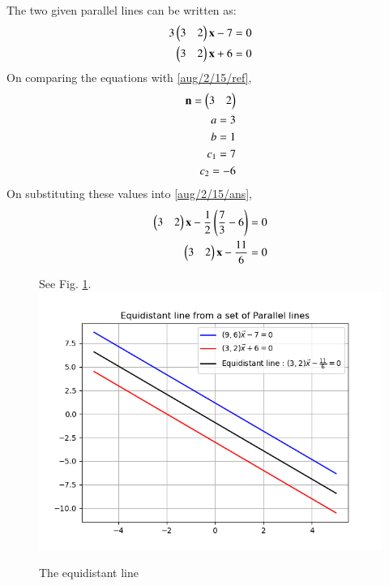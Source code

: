 The two given parallel lines can be written as:
\begin{align}
    3\begin{pmatrix}3 & 2\end{pmatrix}\mathbf{x} - 7 = 0\\
    \begin{pmatrix}3 & 2\end{pmatrix}\mathbf{x} + 6 = 0
\end{align}
On comparing the equations with
\eqref{aug/2/15/ref},
\begin{align}
    \mathbf{n} = \begin{pmatrix}3 & 2\end{pmatrix}\\
    a = 3\\
    b = 1\\
    c_1 = 7\\
    c_2 = -6
\end{align}
On substituting these values into \eqref{aug/2/15/ans},
\begin{align}
    \begin{pmatrix}3 & 2\end{pmatrix}\mathbf{x} - \frac{1}{2}\left(\frac{7}{3} - 6\right) = 0\\
    \begin{pmatrix}3 & 2\end{pmatrix}\mathbf{x} - \frac{11}{6} = 0
\end{align} 
\begin{figure}[!ht]
    See Fig. \ref{fig:aug/2/15/}.
\centering
 \includegraphics[width=\columnwidth]{solutions/aug/2/15/graph.png}
 \caption{The equidistant line}
 \label{fig:aug/2/15/}
 \end{figure}

